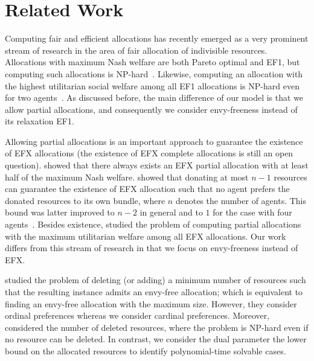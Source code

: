 \section{Related Work}
	
	Computing fair and efficient allocations has recently emerged as a very
	prominent stream of research in the area of fair allocation of indivisible
	resources. Allocations with maximum Nash welfare are both Pareto optimal and EF1, but computing such allocations is
	NP-hard~\cite{CKMPSW19}. Likewise, computing an allocation with the highest
	utilitarian social welfare among all EF1 allocations is NP-hard even for two
	agents~\cite{AzizHMS23}. As discussed before, the main difference of our model
	is that we allow partial allocations, and consequently we consider envy-freeness
	instead of its relaxation EF1.
	
	
	Allowing partial allocations is an important approach to guarantee the existence
	of EFX allocations (the existence of EFX complete allocations is still an open question).  
	\citet{DBLP:conf/ec/CaragiannisGH19} showed that there always exists an EFX
	partial allocation with at least half of the maximum Nash welfare.
	\citet{DBLP:journals/siamcomp/ChaudhuryKMS21} showed that donating at most $n-1$
	resources can guarantee the existence of EFX allocation such that no agent prefers the
	donated resources to its own bundle, where $n$ denotes the number of agents.
	This bound was latter improved to $n-2$ in general and to $1$ for the case with
	four agents~\cite{BergerCFF22}.
	Besides existence, \citet{Bu22} studied the problem of computing partial
	allocations with the maximum utilitarian welfare among all EFX allocations.
	Our work differs from this stream of research in that we focus on envy-freeness
	instead of EFX.
	
	\citet{AzizSW16} studied the problem of deleting (or adding) a minimum number of
	resources such that the resulting instance admits an envy-free allocation; which
	is equivalent to finding an envy-free allocation with the maximum size.
	However, they consider ordinal preferences whereas we consider cardinal preferences.
	Moreover, \citet{AzizSW16} considered the number of deleted resources, where the
	problem is NP-hard even if no resource can be deleted. In contrast, we consider
	the dual parameter the lower bound on the allocated resources to identify polynomial-time solvable cases.
	
